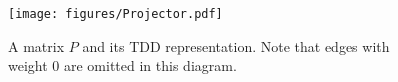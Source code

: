 \documentclass[aspectratio=1610,18pt]{ctexbeamer}
\begin{document}
\begin{frame}
  \begin{figure}[tbh]
    \vspace*{-5mm}
      \centering
     \quad
     \hfil
      \begin{minipage}{0.2\textwidth}  \texttt{[image: figures/Projector.pdf]}
      \end{minipage}
    \caption{A matrix $P$ and its TDD representation. Note that edges with weight 0 are omitted in this diagram.}
        \label{fig:Projector}
    \end{figure}
\end{frame}
\end{document}
